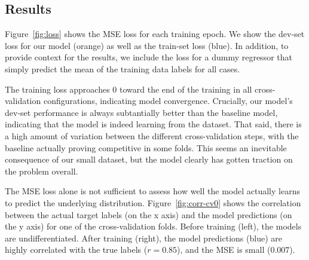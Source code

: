 \documentclass[11pt,a4paper]{article}
\begin{document}


\subsection{Results}

Figure~\ref{fig:loss} shows the MSE loss for each training epoch. We show the dev-set loss for our model (orange) as well as the train-set loss (blue). In addition, to provide context for the results, we include the loss for a dummy regressor that simply predict the mean of the training data labels for all cases.

The training loss approaches 0 toward the end of the training in all cross-validation configurations, indicating model convergence. Crucially, our model's dev-set performance is always subtantially better than the baseline model, indicating that the model is indeed learning from the dataset. That said, there is a high amount of variation between the different cross-validation steps, with the baseline actually proving competitive in some folds. This seems an inevitable consequence of our small dataset, but the model clearly has gotten traction on the problem overall.


The MSE loss alone is not sufficient to assess how well the model actually learns to predict the underlying distribution. Figure~\ref{fig:corr-cv0} shows the correlation between the actual target labels (on the x axis) and the model predictions (on the y axis) for one of the cross-validation folds. Before training (left), the models are undifferentiated. After training (right), the model predictions (blue) are highly correlated with the true labels ($r=0.85$), and the MSE is small ($0.007$).
\end{document}
